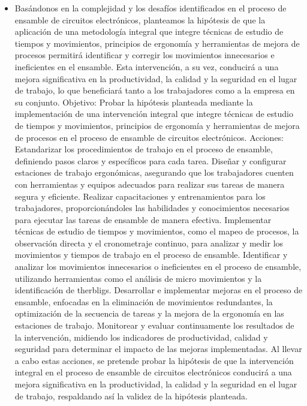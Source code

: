 \begin{itemize}
    \item Basándonos en la complejidad y los desafíos identificados en el proceso de ensamble de circuitos electrónicos, planteamos la hipótesis de que la aplicación de una metodología integral que integre técnicas de estudio de tiempos y movimientos, principios de ergonomía y herramientas de mejora de procesos permitirá identificar y corregir los movimientos innecesarios e ineficientes en el ensamble. Esta intervención, a su vez, conducirá a una mejora significativa en la productividad, la calidad y la seguridad en el lugar de trabajo, lo que beneficiará tanto a los trabajadores como a la empresa en su conjunto.
Objetivo:
Probar la hipótesis planteada mediante la implementación de una intervención integral que integre técnicas de estudio de tiempos y movimientos, principios de ergonomía y herramientas de mejora de procesos en el proceso de ensamble de circuitos electrónicos.
Acciones:
Estandarizar los procedimientos de trabajo en el proceso de ensamble, definiendo pasos claros y específicos para cada tarea.
Diseñar y configurar estaciones de trabajo ergonómicas, asegurando que los trabajadores cuenten con herramientas y equipos adecuados para realizar sus tareas de manera segura y eficiente.
Realizar capacitaciones y entrenamientos para los trabajadores, proporcionándoles las habilidades y conocimientos necesarios para ejecutar las tareas de ensamble de manera efectiva.
Implementar técnicas de estudio de tiempos y movimientos, como el mapeo de procesos, la observación directa y el cronometraje continuo, para analizar y medir los movimientos y tiempos de trabajo en el proceso de ensamble.
Identificar y analizar los movimientos innecesarios o ineficientes en el proceso de ensamble, utilizando herramientas como el análisis de micro movimientos y la identificación de therbligs.
Desarrollar e implementar mejoras en el proceso de ensamble, enfocadas en la eliminación de movimientos redundantes, la optimización de la secuencia de tareas y la mejora de la ergonomía en las estaciones de trabajo.
Monitorear y evaluar continuamente los resultados de la intervención, midiendo los indicadores de productividad, calidad y seguridad para determinar el impacto de las mejoras implementadas.
Al llevar a cabo estas acciones, se pretende probar la hipótesis de que la intervención integral en el proceso de ensamble de circuitos electrónicos conducirá a una mejora significativa en la productividad, la calidad y la seguridad en el lugar de trabajo, respaldando así la validez de la hipótesis planteada.
\end{itemize}
% 
% 
